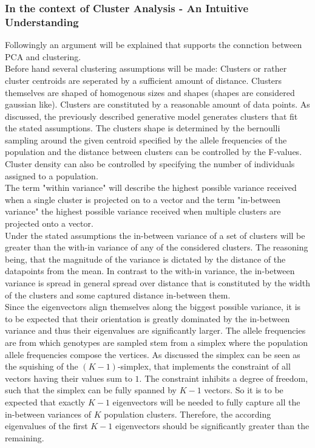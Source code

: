 \documentclass[a4paper, 11pt]{article}
\begin{document}
\subsubsection{In the context of Cluster Analysis - An Intuitive Understanding}
Followingly an argument will be explained that supports the connction between PCA and clustering. \\
Before hand several clustering assumptions will be made: Clusters or rather cluster centroids are seperated by a sufficient amount of distance. Clusters themselves are shaped of homogenous sizes and shapes (shapes are considered gaussian like). Clusters are constituted by a reasonable amount of data points. As discussed, the previously described generative model generates clusters that fit the stated assumptions. The clusters shape is determined by the bernoulli sampling around the given centroid specified by the allele frequencies of the population and the distance between clusters can be controlled by the F-values. Cluster density can also be controlled by specifying the number of individuals assigned to a population.\\
The term "within variance" will describe the highest possible variance received when a single cluster is projected on to a vector and the term "in-between variance" the highest possible variance received when multiple clusters are projected onto a vector.\\
Under the stated assumptions the in-between variance of a set of clusters will be greater than the with-in variance of any of the considered clusters. The reasoning being, that the magnitude of the variance is dictated by the distance of the datapoints from the mean. In contrast to the with-in variance, the in-between variance is spread in general spread over distance that is constituted by the width of the clusters and some captured distance in-between them.\\
Since the eigenvectors align themselves along the biggest possible variance, it is to be expected that their orientation is greatly dominated by the in-between variance and thus their eigenvalues are significantly larger. The allele frequencies are from which genotypes are sampled stem from a simplex where the population allele frequencies compose the vertices. As discussed the simplex can be seen as the squishing of the $(K-1)$-simplex, that implements the constraint of all vectors having their values sum to $1$. The constraint inhibits a degree of freedom, such that the simplex can be fully spanned by $K-1$ vectors. So it is to be expected that exactly $K-1$ eigenvectors will be needed to fully capture all the in-between variances of $K$ population clusters. Therefore, the according eigenvalues of the first $K-1$ eigenvectors should be significantly greater than the remaining.\\
\end{document}
